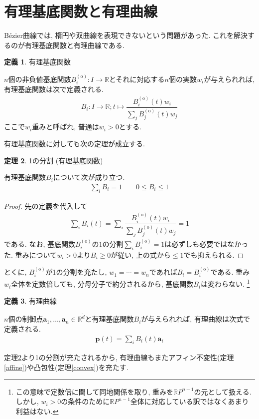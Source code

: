 \documentclass{jsarticle}
\newcommand\setR{\mathbb{R}}
\theoremstyle{definition}%
\newtheorem{thm}{定理}
\newtheorem{defn}[thm]{定義}
\begin{document}
\section{有理基底関数と有理曲線}
B\'ezier曲線では, 楕円や双曲線を表現できないという問題があった.
これを解決するのが有理基底関数と有理曲線である.
\begin{screen}
	\begin{defn}
		有理基底関数

		$n$個の非負値基底関数$B_i^{(\text{o})}:I\to \setR$とそれに対応する$n$個の実数$w_i$が与えられれば, 有理基底関数は次で定義される.
		\begin{align}
			B_i:I\to \setR;t\mapsto \dfrac{B_{i}^{(\text{o})}(t)w_i}{\sum\limits_{j}B_{j}^{(\text{o})}(t)w_j}
		\end{align}
		ここで$w_i$重みと呼ばれ, 普通は$w_i>0$とする.
	\end{defn}
\end{screen}
有理基底関数に対しても次の定理が成立する.
\begin{screen}
	\begin{thm}
		\label{Thm201}
		1の分割 (有理基底関数)

        有理基底関数$B_i$について次が成り立つ.
		\begin{align}
			\sum_i B_i= 1 \qquad
            0\le B_i\le 1
		\end{align}
	\end{thm}
\end{screen}
\begin{proof}
	先の定義を代入して
	\begin{align}
		\sum_i B_i(t)=\sum_i \dfrac{B_{i}^{(\text{o})}(t)w_i}{\sum\limits_{j}B_{j}^{(\text{o})}(t)w_j}= 1
	\end{align}
	である.
	なお, 基底関数$B_i^{(\text{o})}$の$1$の分割$\sum\limits_iB_i^{(\text{o})}= 1$は必ずしも必要ではなかった.
    重みについて$w_i>0$より$B_i\ge 0$が従い, 上の式から$\le 1$でも抑えられる.
\end{proof}
とくに, $B_i^{(\text{o})}$が1の分割を充たし, $w_1=\cdots=w_n$であれば$B_i=B_i^{(\text{o})}$である.
重み$w_i$全体を定数倍しても, 分母分子で約分されるから, 基底関数$B_i$は変わらない.%
\footnote{この意味で定数倍に関して同地関係を取り, 重みを$\setR P^{n-1}$の元として扱える. しかし, $w_i>0$の条件のために$\setR P^{n-1}$全体に対応している訳ではなくあまり利益はない.}
\begin{screen}
	\begin{defn}
		有理曲線

        $n$個の制御点$\bm{a}_1, \dots, \bm{a}_n\in\mathbb{R}^{\tilde{d}}$と有理基底関数$B_i$が与えられれば, 有理曲線は次式で定義される.
		\begin{align}
			\bm{p}(t)=\sum_i B_i(t) \bm{a}_i
		\end{align}
	\end{defn}
\end{screen}
定理\ref{Thm201}より1の分割が充たされるから, 有理曲線もまたアフィン不変性(定理\ref{affine})や凸包性(定理\ref{convex})を充たす.
\end{document}
